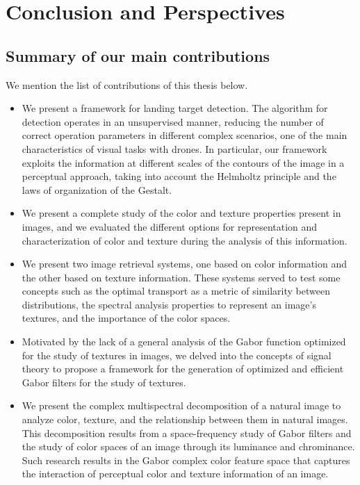 \chapter{Conclusion and Perspectives}\label{ch:general_conclusion}

\section{Summary of our main contributions}

We mention the list of contributions of this thesis below.

\begin{itemize}
	\item We present a framework for landing target detection. The algorithm for detection operates in an unsupervised manner, reducing the number of correct operation parameters in different complex scenarios, one of the main characteristics of visual tasks with drones. In particular, our framework exploits the information at different scales of the contours of the image in a perceptual approach, taking into account the Helmholtz principle and the laws of organization of the Gestalt.
	\item We present a complete study of the color and texture properties present in images, and we evaluated the different options for representation and characterization of color and texture during the analysis of this information.
	\item We present two image retrieval systems, one based on color information and the other based on texture information. These systems served to test some concepts such as the optimal transport as a metric of similarity between distributions, the spectral analysis properties to represent an image's textures, and the importance of the color spaces.
	\item Motivated by the lack of a general analysis of the Gabor function optimized for the study of textures in images, we delved into the concepts of signal theory to propose a framework for the generation of optimized and efficient Gabor filters for the study of textures.
	\item We present the complex multispectral decomposition of a natural image to analyze color, texture, and the relationship between them in natural images. This decomposition results from a space-frequency study of Gabor filters and the study of color spaces of an image through its luminance and chrominance. Such research results in the Gabor complex color feature space that captures the interaction of perceptual color and texture information of an image.

\end{itemize}
